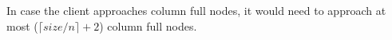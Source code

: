 \documentclass[sigconf, screen=true, nonacm]{acmart}
\newcommand{\DA}{\textit{DA layer}}
\begin{document}
        In case the client approaches column full nodes, it would need to approach at most ($\lceil size/n \rceil + 2$) column full nodes. 
    





\end{document}
